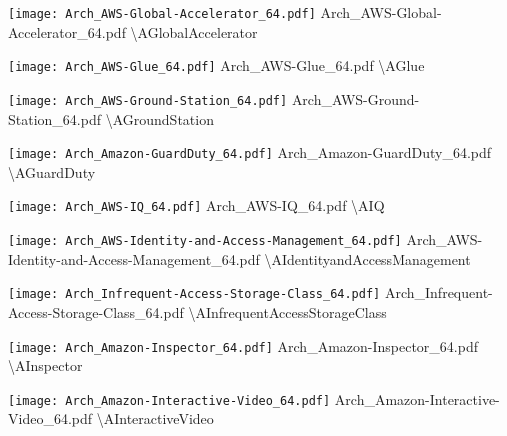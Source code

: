  {\texttt{[image: Arch\_AWS-Global-Accelerator\_64.pdf]}} {Arch\_AWS-Global-Accelerator\_64.pdf} {{\textbackslash}AGlobalAccelerator}

 {\texttt{[image: Arch\_AWS-Glue\_64.pdf]}} {Arch\_AWS-Glue\_64.pdf} {{\textbackslash}AGlue}

 {\texttt{[image: Arch\_AWS-Ground-Station\_64.pdf]}} {Arch\_AWS-Ground-Station\_64.pdf} {{\textbackslash}AGroundStation}

 {\texttt{[image: Arch\_Amazon-GuardDuty\_64.pdf]}} {Arch\_Amazon-GuardDuty\_64.pdf} {{\textbackslash}AGuardDuty}

 {\texttt{[image: Arch\_AWS-IQ\_64.pdf]}} {Arch\_AWS-IQ\_64.pdf} {{\textbackslash}AIQ}

 {\texttt{[image: Arch\_AWS-Identity-and-Access-Management\_64.pdf]}} {Arch\_AWS-Identity-and-Access-Management\_64.pdf} {{\textbackslash}AIdentityandAccessManagement}

 {\texttt{[image: Arch\_Infrequent-Access-Storage-Class\_64.pdf]}} {Arch\_Infrequent-Access-Storage-Class\_64.pdf} {{\textbackslash}AInfrequentAccessStorageClass}

 {\texttt{[image: Arch\_Amazon-Inspector\_64.pdf]}} {Arch\_Amazon-Inspector\_64.pdf} {{\textbackslash}AInspector}

 {\texttt{[image: Arch\_Amazon-Interactive-Video\_64.pdf]}} {Arch\_Amazon-Interactive-Video\_64.pdf} {{\textbackslash}AInteractiveVideo}

